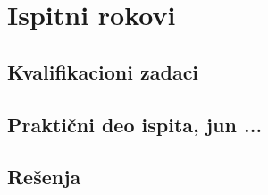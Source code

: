 \appendix
\chapter{Ispitni rokovi}

\section{Kvalifikacioni zadaci}

\section{Praktični deo ispita, jun ...}




\section{Rešenja}
\shipoutAnswer
